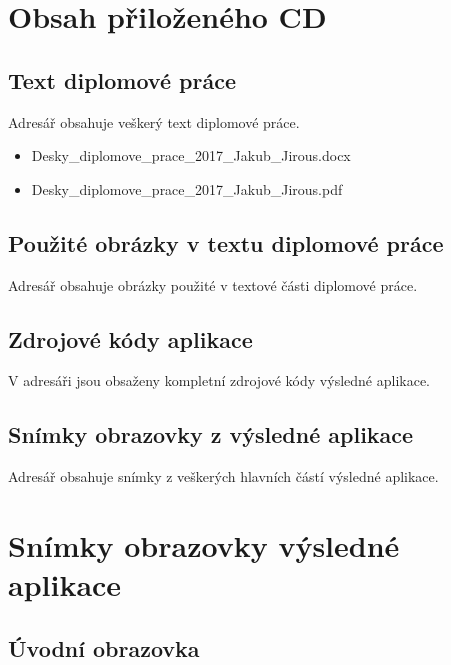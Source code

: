 \appendix

\chapter{Obsah přiloženého CD}

\section{Text diplomové práce}
Adresář obsahuje veškerý text diplomové práce. 
\begin{itemize}
\item Desky\_diplomove\_prace\_2017\_Jakub\_Jirous.docx
\item Desky\_diplomove\_prace\_2017\_Jakub\_Jirous.pdf
\end{itemize}


\section{Použité obrázky v textu diplomové práce}
Adresář obsahuje obrázky použité v textové části diplomové práce.


\section{Zdrojové kódy aplikace}
V adresáři jsou obsaženy kompletní zdrojové kódy výsledné aplikace.


\section{Snímky obrazovky z výsledné aplikace}
Adresář obsahuje snímky z veškerých hlavních částí výsledné aplikace.


\chapter{Snímky obrazovky výsledné aplikace}

\section{Úvodní obrazovka}

